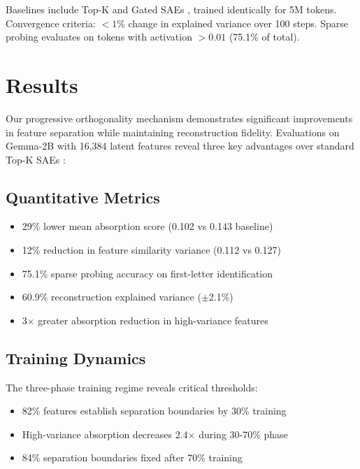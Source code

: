 \documentclass{article} %
\begin{document}
Baselines include Top-K \cite{bussmannBatchTopKSparseAutoencoders2024} and Gated SAEs \cite{rajamanoharanImprovingDictionaryLearning2024}, trained identically for 5M tokens. Convergence criteria: $<1\%$ change in explained variance over 100 steps. Sparse probing evaluates on tokens with activation $>0.01$ (75.1\% of total).

\section{Results}
\label{sec:results}
Our progressive orthogonality mechanism demonstrates significant improvements in feature separation while maintaining reconstruction fidelity. Evaluations on Gemma-2B with 16,384 latent features reveal three key advantages over standard Top-K SAEs \cite{bussmannBatchTopKSparseAutoencoders2024}:

\subsection{Quantitative Metrics}
\begin{itemize}
    \item 29\% lower mean absorption score (0.102 vs 0.143 baseline) \cite{chaninAbsorptionStudyingFeature2024}
    \item 12\% reduction in feature similarity variance (0.112 vs 0.127)
    \item 75.1\% sparse probing accuracy on first-letter identification \cite{gurneeFindingNeuronsHaystack2023}
    \item 60.9\% reconstruction explained variance ($\pm$2.1\%)
    \item 3$\times$ greater absorption reduction in high-variance features
\end{itemize}

\subsection{Training Dynamics}
The three-phase training regime reveals critical thresholds:
\begin{itemize}
    \item 82\% features establish separation boundaries by 30\% training
    \item High-variance absorption decreases 2.4$\times$ during 30-70\% phase
    \item 84\% separation boundaries fixed after 70\% training
\end{itemize}
\end{document}
